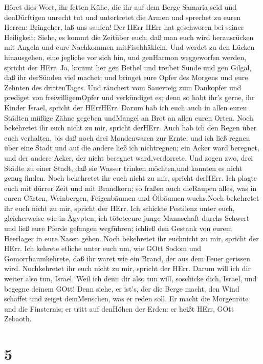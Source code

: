  Höret dies Wort, ihr fetten Kühe, die ihr auf dem Berge
Samaria seid und denDürftigen unrecht tut und untertretet die Armen und
sprechet zu euren Herren: Bringeher, laß uns saufen!  Der
HErr HErr hat geschworen bei seiner Heiligkeit: Siehe, es kommt die
Zeitüber euch, daß man euch wird herausrücken mit Angeln und eure
Nachkommen mitFischhäklein.  Und werdet zu den Lücken
hinausgehen, eine jegliche vor sich hin, und genHarmon weggeworfen
werden, spricht der HErr.  Ja, kommt her gen Bethel und
treibet Sünde und gen Gilgal, daß ihr derSünden viel machet; und bringet
eure Opfer des Morgens und eure Zehnten des drittenTages. 
Und räuchert vom Sauerteig zum Dankopfer und prediget von
freiwilligemOpfer und verkündiget es; denn so habt ihr's gerne, ihr
Kinder Israel, spricht der HErrHErr.  Darum hab ich euch
auch in allen euren Städten müßige Zähne gegeben undMangel an Brot an
allen euren Orten. Noch bekehretet ihr euch nicht zu mir, spricht
derHErr.  Auch hab ich den Regen über euch verhalten, bis
daß noch drei Mondenwaren zur Ernte; und ich ließ regnen über eine Stadt
und auf die andere ließ ich nichtregnen; ein Acker ward beregnet, und
der andere Acker, der nicht beregnet ward,verdorrete.  Und
zogen zwo, drei Städte zu einer Stadt, daß sie Wasser trinken
möchten,und konnten es nicht genug finden. Noch bekehretet ihr euch
nicht zu mir, spricht derHErr.  Ich plagte euch mit dürrer
Zeit und mit Brandkorn; so fraßen auch dieRaupen alles, was in euren
Gärten, Weinbergen, Feigenbäumen und Ölbäumen wuchs.Noch bekehretet ihr
euch nicht zu mir, spricht der HErr.  Ich schickte
Pestilenz unter euch, gleicherweise wie in Ägypten; ich töteteeure junge
Mannschaft durchs Schwert und ließ eure Pferde gefangen wegführen;
ichließ den Gestank von eurem Heerlager in eure Nasen gehen. Noch
bekehretet ihr euchnicht zu mir, spricht der HErr.  Ich
kehrete etliche unter euch um, wie GOtt Sodom und Gomorrhaumkehrete, daß
ihr waret wie ein Brand, der aus dem Feuer gerissen wird. Nochkehretet
ihr euch nicht zu mir, spricht der HErr.  Darum will ich
dir weiter also tun, Israel. Weil ich denn dir also tun will, soschicke
dich, Israel, und begegne deinem GOtt!  Denn siehe, er
ist's, der die Berge macht, den Wind schaffet und zeiget demMenschen,
was er reden soll. Er macht die Morgenröte und die Finsternis; er tritt
auf denHöhen der Erden: er heißt HErr, GOtt Zebaoth.

\hypertarget{section-4}{%
\section{5}\label{section-4}}

